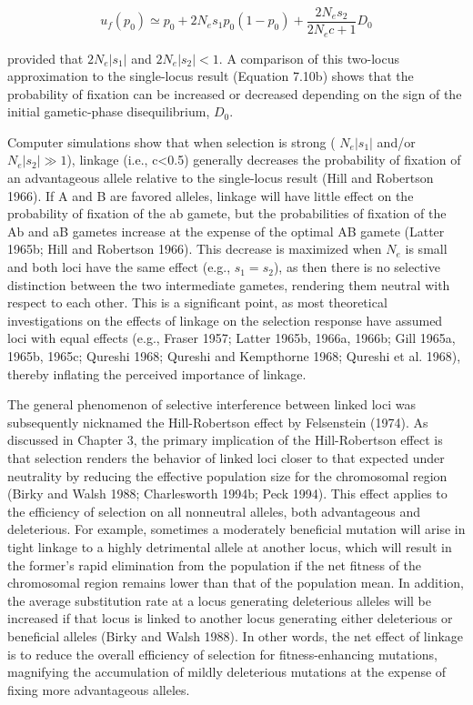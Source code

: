 \documentclass{article}
\begin{document}
\begin{equation}
u_{f}(p_{0})\simeq p_{0}+2N_{e}s_{1}p_{0}(1-p_{0})+\frac{2N_{e}s_{2}}{2N_{e}c+1}D_{0}
\tag{7.43}
\label{eq:7_43}
\end{equation}

provided that  $ 2N_e|s_1| $ and  $ 2N_e|s_2| < 1 $. A comparison of this two-locus approximation to the single-locus result (Equation 7.10b) shows that the probability of fixation can be increased or decreased depending on the sign of the initial gametic-phase disequilibrium,  $ D_0 $.

Computer simulations show that when selection is strong ( $ N_e|s_1| $ and/or  $ N_e|s_2|\gg1 $), linkage (i.e., c<0.5) generally decreases the probability of fixation of an advantageous allele relative to the single-locus result (Hill and Robertson 1966). If A and B are favored alleles, linkage will have little effect on the probability of fixation of the ab gamete, but the probabilities of fixation of the Ab and aB gametes increase at the expense of the optimal AB gamete (Latter 1965b; Hill and Robertson 1966). This decrease is maximized when  $ N_e $ is small and both loci have the same effect (e.g.,  $ s_1 = s_2 $), as then there is no selective distinction between the two intermediate gametes, rendering them neutral with respect to each other. This is a significant point, as most theoretical investigations on the effects of linkage on the selection response have assumed loci with equal effects (e.g., Fraser 1957; Latter 1965b, 1966a, 1966b; Gill 1965a, 1965b, 1965c; Qureshi 1968; Qureshi and Kempthorne 1968; Qureshi et al. 1968), thereby inflating the perceived importance of linkage.

The general phenomenon of selective interference between linked loci was subsequently nicknamed the Hill-Robertson effect by Felsenstein (1974). As discussed in Chapter 3, the primary implication of the Hill-Robertson effect is that selection renders the behavior of linked loci closer to that expected under neutrality by reducing the effective population size for the chromosomal region (Birky and Walsh 1988; Charlesworth 1994b; Peck 1994). This effect applies to the efficiency of selection on all nonneutral alleles, both advantageous and deleterious. For example, sometimes a moderately beneficial mutation will arise in tight linkage to a highly detrimental allele at another locus, which will result in the former's rapid elimination from the population if the net fitness of the chromosomal region remains lower than that of the population mean. In addition, the average substitution rate at a locus generating deleterious alleles will be increased if that locus is linked to another locus generating either deleterious or beneficial alleles (Birky and Walsh 1988). In other words, the net effect of linkage is to reduce the overall efficiency of selection for fitness-enhancing mutations, magnifying the accumulation of mildly deleterious mutations at the expense of fixing more advantageous alleles.
\end{document}
